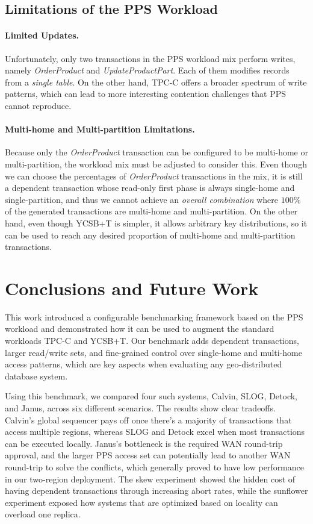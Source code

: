 \documentclass{article}
\begin{document}
\subsection{Limitations of the PPS Workload}
\label{subsec: limitations-of-the-pps-workload}
\paragraph{Limited Updates.}
Unfortunately, only two transactions in the PPS workload mix perform writes, namely \textit{OrderProduct} and \textit{UpdateProductPart}. Each of them modifies records from a \textit{single table}. On the other hand, TPC-C offers a broader spectrum of write patterns, which can lead to more interesting contention challenges that PPS cannot reproduce.

\paragraph{Multi-home and Multi-partition Limitations.}
Because only the \textit{OrderProduct} transaction can be configured to be multi-home or multi-partition, the workload mix must be adjusted to consider this. Even though we can choose the percentages of \textit{OrderProduct} transactions in the mix, it is still a dependent transaction whose read-only first phase is always single-home and single-partition, and thus we cannot achieve an \textit{overall combination} where $100\%$ of the generated transactions are multi-home and multi-partition. On the other hand, even though YCSB+T is simpler, it allows arbitrary key distributions, so it can be used to reach any desired proportion of multi-home and multi-partition transactions.

\section{Conclusions and Future Work}
\label{sec: conclusion-and-future-work}

This work introduced a configurable benchmarking framework based on the PPS workload and demonstrated how it can be used to augment the standard workloads TPC-C and YCSB+T. Our benchmark adds dependent transactions, larger read/write sets, and fine-grained control over single-home and multi-home access patterns, which are key aspects when evaluating any geo-distributed database system. 

Using this benchmark, we compared four such systems, Calvin, SLOG, Detock, and Janus, across six different scenarios. The results show clear tradeoffs. Calvin's global sequencer pays off once there's a majority of transactions that access multiple regions, whereas SLOG and Detock excel when most transactions can be executed locally. Janus's bottleneck is the required WAN round-trip approval, and the larger PPS access set can potentially lead to another WAN round-trip to solve the conflicts, which generally proved to have low performance in our two-region deployment. The skew experiment showed the hidden cost of having dependent transactions through increasing abort rates, while the sunflower experiment exposed how systems that are optimized based on locality can overload one replica.
\end{document}

